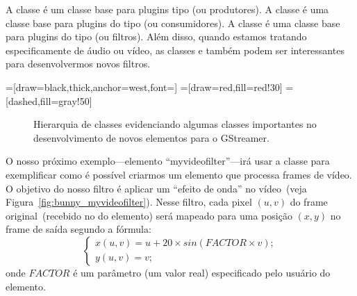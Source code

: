 A classe  é um classe base para plugins tipo  (ou
produtores).  A classe  é uma classe base para plugins do tipo
 (ou consumidores).  A classe  é uma classe base
para plugins do tipo  (ou filtros).  Além disso, quando estamos
tratando especificamente de áudio ou vídeo, as classes  e
 também podem ser interessantes para desenvolvermos novos
filtros.

=[draw=black,thick,anchor=west,font=\scriptsize]
=[draw=red,fill=red!30]
=[dashed,fill=gray!50]
\begin{figure}[H]
  \centering
  \label{fig:plugins_base_classes}
  \caption{Hierarquia de classes evidenciando algumas classes importantes no
           desenvolvimento de novos elementos para o GStreamer.}
\end{figure}

O nosso próximo exemplo---elemento ``myvideofilter''---irá usar a classe
 para exemplificar como é possível criarmos um elemento que
processa frames de vídeo.  O objetivo do nosso filtro é aplicar um ``efeito de
onda'' no vídeo~(veja Figura~\ref{fig:bunny_myvideofilter}).  Nesse filtro,
cada pixel $(u, v)$ do frame original~(recebido no  do elemento)
será mapeado para uma posição $(x, y)$ no frame de saída segundo a fórmula:
\begin{equation}
  \begin{cases}
  x(u, v) = u + 20 \times sin ( FACTOR \times v); \\
  y(u, v) = v;
  \end{cases}
  \label{eq:wave_filter}
\end{equation}
onde $FACTOR$ é um parâmetro (um valor real) especificado pelo usuário do
elemento.

